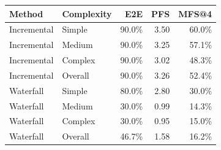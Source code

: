 \begin{tabular}{llrrr}
\toprule
Method & Complexity & E2E & PFS & MFS@4 \\
\midrule
Incremental & Simple & 90.0\% & 3.50 & 60.0\% \\
Incremental & Medium & 90.0\% & 3.25 & 57.1\% \\
Incremental & Complex & 90.0\% & 3.02 & 48.3\% \\
Incremental & Overall & 90.0\% & 3.26 & 52.4\% \\
Waterfall & Simple & 80.0\% & 2.80 & 30.0\% \\
Waterfall & Medium & 30.0\% & 0.99 & 14.3\% \\
Waterfall & Complex & 30.0\% & 0.95 & 15.0\% \\
Waterfall & Overall & 46.7\% & 1.58 & 16.2\% \\
\bottomrule
\end{tabular}
